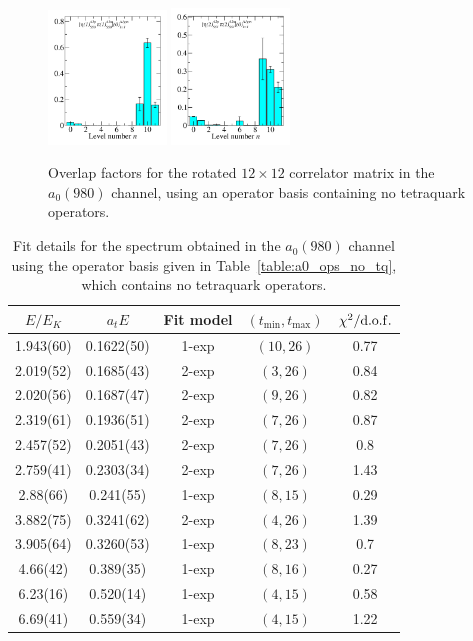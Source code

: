 \begin{figure}
  \includegraphics[width=0.28\textwidth]{figures/spectrum_a1gm/no_tq/zfactors/zfactor_isotriplet_eta_pion-A1gm_1-P001-A2p-SS_0-P00-1-A2m-SS_0.pdf}
  \includegraphics[width=0.28\textwidth]{figures/spectrum_a1gm/no_tq/zfactors/zfactor_isotriplet_eta_pion-A1gm_1-P011-A2p-SS_1-P0-1-1-A2m-SS_1.pdf}
  \caption{Overlap factors for the rotated $12\times 12$ correlator matrix in the $a_0(980)$ channel, using an operator basis containing no tetraquark operators.}
  \label{fig:a0_no_tq_zfactors}
\end{figure}

\begin{table}
  \centering
  \begin{tabular}{c|c|c|c|c}
    $E / E_K$ & $a_t E$ & Fit model & $(t_{\mathrm{min}}, {t_\mathrm{max}})$ & $\chi^2 / \rm{d.o.f.}$\\
    \hline
    1.943(60)&0.1622(50)&1{-}exp&$(10, 26)$&0.77\\
    2.019(52)&0.1685(43)&2{-}exp&$(3, 26)$&0.84\\
    2.020(56)&0.1687(47)&2{-}exp&$(9, 26)$&0.82\\
    2.319(61)&0.1936(51)&2{-}exp&$(7, 26)$&0.87\\
    2.457(52)&0.2051(43)&2{-}exp&$(7, 26)$&0.8\\
    2.759(41)&0.2303(34)&2{-}exp&$(7, 26)$&1.43\\
    2.88(66)&0.241(55)&1{-}exp&$(8, 15)$&0.29\\
    3.882(75)&0.3241(62)&2{-}exp&$(4, 26)$&1.39\\
    3.905(64)&0.3260(53)&1{-}exp&$(8, 23)$&0.7\\
    4.66(42)&0.389(35)&1{-}exp&$(8, 16)$&0.27\\
    6.23(16)&0.520(14)&1{-}exp&$(4, 15)$&0.58\\
    6.69(41)&0.559(34)&1{-}exp&$(4, 15)$&1.22
  \end{tabular}
  \caption{Fit details for the spectrum obtained in the $a_0(980)$ channel using the operator basis given in Table~\ref{table:a0_ops_no_tq}, which contains no tetraquark operators.}
  \label{table:a0_no_tq_spectrum}
\end{table}

